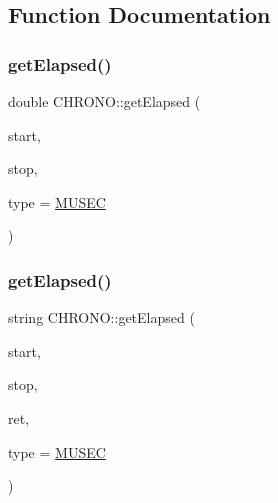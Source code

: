 \subsection{Function Documentation}
\mbox{\label{namespace_c_h_r_o_n_o_aebe2329c142a6f06b6fede41c3abf1b3}} 
\subsubsection{\texorpdfstring{getElapsed()}{getElapsed()}\hspace{0.1cm}{\footnotesize\ttfamily [1/2]}}
{\footnotesize\ttfamily double C\+H\+R\+O\+N\+O\+::get\+Elapsed (\begin{DoxyParamCaption}\item[{Clock\+::time\+\_\+point}]{start,  }\item[{Clock\+::time\+\_\+point}]{stop,  }\item[{\mbox{\hyperlink{namespace_c_h_r_o_n_o_a246e471488a6e6b17ddb86e3b817c7d9}{T\+I\+M\+E\+\_\+\+T\+Y\+PE}}}]{type = {\ttfamily \mbox{\hyperlink{namespace_c_h_r_o_n_o_a246e471488a6e6b17ddb86e3b817c7d9aba8c3a9d281e3b934b74d5ff97a3a093}{M\+U\+S\+EC}}} }\end{DoxyParamCaption})\hspace{0.3cm}{\ttfamily [inline]}}

\mbox{\label{namespace_c_h_r_o_n_o_ad8da7180c420d59f4c0077b60579c0ae}} 
\subsubsection{\texorpdfstring{getElapsed()}{getElapsed()}\hspace{0.1cm}{\footnotesize\ttfamily [2/2]}}
{\footnotesize\ttfamily string C\+H\+R\+O\+N\+O\+::get\+Elapsed (\begin{DoxyParamCaption}\item[{Clock\+::time\+\_\+point}]{start,  }\item[{Clock\+::time\+\_\+point}]{stop,  }\item[{string}]{ret,  }\item[{\mbox{\hyperlink{namespace_c_h_r_o_n_o_a246e471488a6e6b17ddb86e3b817c7d9}{T\+I\+M\+E\+\_\+\+T\+Y\+PE}}}]{type = {\ttfamily \mbox{\hyperlink{namespace_c_h_r_o_n_o_a246e471488a6e6b17ddb86e3b817c7d9aba8c3a9d281e3b934b74d5ff97a3a093}{M\+U\+S\+EC}}} }\end{DoxyParamCaption})\hspace{0.3cm}{\ttfamily [inline]}}


